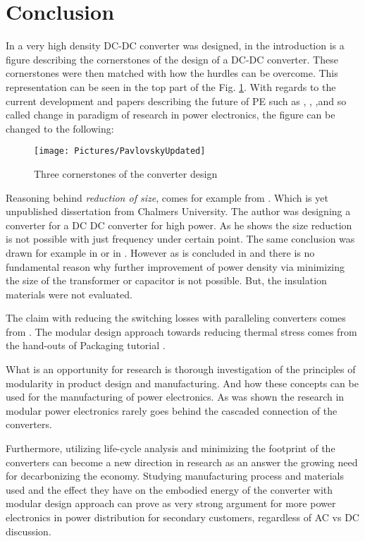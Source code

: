 \documentclass[]{scrartcl}
\begin{document}
\newpage
\section{Conclusion}

In \cite{Pavlovsky2006} a very high density DC-DC converter was designed, in the introduction is a figure describing the cornerstones of the design of a DC-DC converter. These cornerstones were then matched with how the hurdles can be overcome. This representation can be seen in the top part of the Fig. \ref{fig:pavlovskyupdated}. With regards to the current development and papers describing the future of PE such as \cite{VanWyk2013}, \cite{Kolar2014a},\cite{Boroyevich2015} ,and so called change in paradigm of research in power electronics, the figure can be changed to the following: 

\begin{figure}[h!]
	\centering
	\texttt{[image: Pictures/PavlovskyUpdated]}
	\caption{Three cornerstones of the converter design}
	\label{fig:pavlovskyupdated}
\end{figure}



Reasoning behind \emph{reduction of size}, comes for example from \cite{Bahmani2016a}. Which is yet unpublished dissertation from Chalmers University. The author was designing a converter for a DC DC converter for high power. As he shows the size reduction is not possible with just frequency under certain point. The same conclusion was drawn for example in \cite{Fan2011} or in \cite{Yang2015a}. However as is concluded in \cite{Hanson2016} and \cite{Kyaw2015} there is no fundamental reason why further improvement of power density via minimizing the size of the transformer  or capacitor is not possible. But, the insulation materials were not evaluated.

The claim with reducing the switching losses with paralleling converters comes from \cite{Kolar2015a}. The modular design approach towards reducing thermal stress comes from the hand-outs of Packaging tutorial \cite{Faculty2014a}.

What is an opportunity for research is thorough investigation of the principles of modularity in product design and manufacturing. And how these concepts can be used for the manufacturing of power electronics. As was shown the research in modular power electronics rarely goes behind the cascaded connection of the converters. 

Furthermore, utilizing life-cycle analysis and minimizing the footprint of the converters can become a new direction in research as an answer the growing need for decarbonizing the economy. Studying manufacturing process and materials used and the effect they have on the embodied energy of the converter with modular design approach can prove as very strong argument for more power electronics in power distribution for secondary customers, regardless of AC vs DC discussion. 
\end{document}
